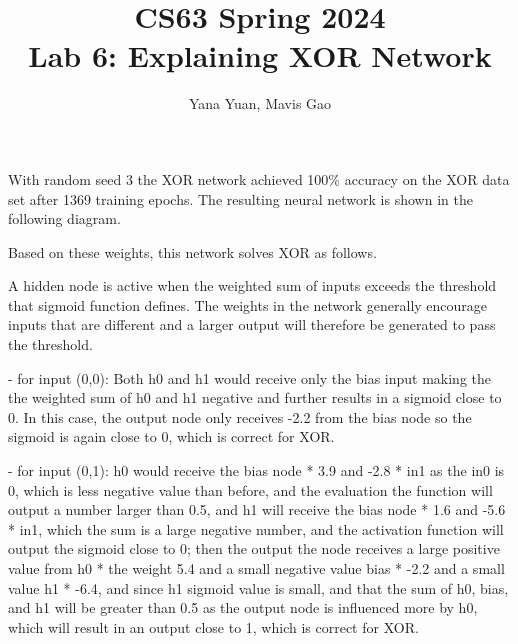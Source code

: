 \documentclass[11pt]{article}
\title{CS63 Spring 2024\\Lab 6: Explaining XOR Network}
\author{Yana Yuan, Mavis Gao}
\begin{document}
\maketitle

With random seed 3
the XOR network achieved 100\% accuracy on the XOR data set after
1369
training epochs.  The resulting neural network is shown in the
following diagram.

\begin{center}
\end{center}

Based on these weights, this network solves XOR as follows.

A hidden node is active when the weighted sum of inputs exceeds the threshold 
that sigmoid function defines.
The weights in the network generally encourage inputs that are different and 
a larger output will therefore be generated to pass the threshold.

- for input (0,0): Both h0 and h1 would receive only the bias input making the
the weighted sum of h0 and h1 negative and further results in a sigmoid close to 0.
In this case, the output node only receives -2.2 from the bias node so the sigmoid is
again close to 0, which is correct for XOR. 

- for input (0,1): h0 would receive the bias node * 3.9 and -2.8 * in1
 as the in0 is 0, which is less negative value than before, and the evaluation 
 the function will output a number larger than 0.5, and h1 will receive 
 the bias node * 1.6 and -5.6 * in1, which the sum is a large negative number, 
 and the activation function will output the sigmoid close to 0; then the output
 the node receives a large positive value from h0 * the weight 5.4 and a small negative value
 bias * -2.2 and a small value h1 * -6.4, and since h1 sigmoid value is small, and that the sum
 of h0, bias, and h1 will be greater than 0.5 as the output node is influenced more
 by h0, which will result in an output close to 1, which is correct for XOR. 
\end{document}
